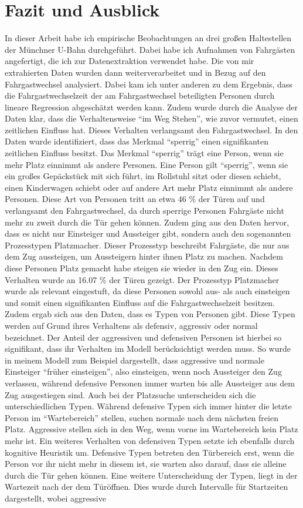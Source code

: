 \chapter{Fazit und Ausblick} \label{Fazit und Ausblick}
In dieser Arbeit habe ich empirische Beobachtungen an drei großen Haltestellen der Münchner U-Bahn durchgeführt. Dabei habe ich Aufnahmen von Fahrgästen angefertigt, die ich zur Datenextraktion verwendet habe. Die von mir extrahierten Daten wurden dann weiterverarbeitet und in Bezug auf den Fahrgastwechsel analysiert. Dabei kam ich unter anderen zu dem Ergebnis, dass die Fahrgastwechselzeit der am Fahrgastwechsel beteiligten Personen durch lineare Regression abgeschätzt werden kann. Zudem wurde durch die Analyse der Daten klar, dass die Verhaltensweise "`im Weg Stehen"', wie zuvor vermutet, einen zeitlichen Einfluss hat. Dieses Verhalten verlangsamt den Fahrgastwechsel. In den Daten wurde identifiziert, dass das Merkmal "`sperrig"' einen signifikanten zeitlichen Einfluss besitzt. Das Merkmal "`sperrig"' trägt eine Person, wenn sie mehr Platz einnimmt als andere Personen. Eine Person gilt "`sperrig"', wenn sie ein großes Gepäckstück mit sich führt, im Rollstuhl sitzt oder diesen schiebt, einen Kinderwagen schiebt oder auf andere Art mehr Platz einnimmt als andere Personen. Diese Art von Personen tritt an etwa 46 \% der Türen auf und verlangsamt den Fahrgastwechsel, da durch sperrige Personen Fahrgäste nicht mehr zu zweit durch die Tür gehen können. Zudem ging aus den Daten hervor, dass es nicht nur Einsteiger und Aussteiger gibt, sondern auch den sogenannten Prozesstypen Platzmacher. Dieser Prozesstyp beschreibt Fahrgäste, die nur aus dem Zug aussteigen, um Aussteigern hinter ihnen Platz zu machen. Nachdem diese Personen Platz gemacht habe steigen sie wieder in den Zug ein. Dieses Verhalten wurde an 16.07 \% der Türen gezeigt. Der Prozesstyp Platzmacher wurde als relevant eingestuft, da diese Personen sowohl aus- als auch einsteigen und somit einen signifikanten Einfluss auf die Fahrgastwechselzeit besitzen. Zudem ergab sich aus den Daten, dass es Typen von Personen gibt. Diese Typen werden auf Grund ihres Verhaltens als defensiv, aggressiv oder normal bezeichnet. Der Anteil der aggressiven und defensiven Personen ist hierbei so signifikant, dass ihr Verhalten im Modell berücksichtigt werden muss. So wurde in meinem Modell zum Beispiel dargestellt, dass aggressive und normale Einsteiger "`früher einsteigen"', also einsteigen, wenn noch Aussteiger den Zug verlassen, während defensive Personen immer warten bis alle Aussteiger aus dem Zug ausgestiegen sind. Auch bei der Platzsuche unterscheiden sich die unterschiedlichen Typen. Während defensive Typen sich immer hinter die letzte Person im "`Wartebereich"' stellen, suchen normale nach dem nächsten freien Platz. Aggressive stellen sich in den Weg, wenn vorne im Wartebereich kein Platz mehr ist. Ein weiteres Verhalten von defensiven Typen setzte ich ebenfalls durch kognitive Heuristik um. Defensive Typen betreten den Türbereich erst, wenn die Person vor ihr nicht mehr in diesem ist, sie warten also darauf, dass sie alleine durch die Tür gehen können. Eine weitere Unterscheidung der Typen, liegt in der Wartezeit nach der dem Türöffnen. Dies wurde durch Intervalle für Startzeiten dargestellt, wobei aggressive 